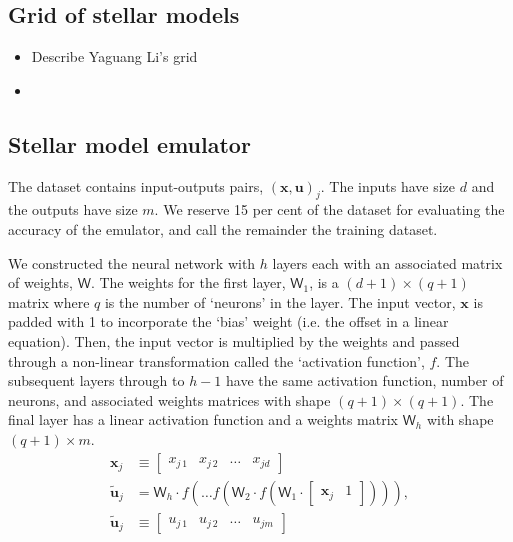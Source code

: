 \documentclass[fleqn,usenatbib]{mnras}
\renewcommand*{\vec}[1]{\boldsymbol{#1}}
\newcommand*{\mat}[1]{\boldsymbol{\mathsf{#1}}}
\newcommand{\inputs}{{\vec{x}}}
\newcommand{\outputs}{{\vec{u}}}
\newcommand{\pred}{{\tilde{\outputs}}}
\begin{document}
\subsection{Grid of stellar models}
\label{sec:grid}

\begin{itemize}
    \item Describe Yaguang Li's grid
    \item 
\end{itemize}

\subsection{Stellar model emulator}
\label{sec:emulator}

The dataset contains input-outputs pairs, \((\inputs, \outputs)_j\). The inputs have size \(d\) and the outputs have size \(m\). We reserve 15 per cent of the dataset for evaluating the accuracy of the emulator, and call the remainder the training dataset.

We constructed the neural network with \(h\) layers each with an associated matrix of weights, \(\mat W\). The weights for the first layer, \(\mat W_1\), is a \((d + 1) \times (q + 1)\) matrix where \(q\) is the number of `neurons' in the layer. The input vector, \(\inputs\) is padded with 1 to incorporate the `bias' weight (i.e. the offset in a linear equation). Then, the input vector is multiplied by the weights and passed through a non-linear transformation called the `activation function', \(f\). The subsequent layers through to \(h-1\) have the same activation function, number of neurons, and associated weights matrices with shape \((q + 1) \times (q + 1)\). The final layer has a linear activation function and a weights matrix \(\mat W_h\) with shape \((q + 1) \times m\). 
%
%
%
\begin{align}
    \vec x_j &\equiv 
    \begin{bmatrix}
        x_{j\,1} & x_{j\,2} & \dots & x_{jd}
    \end{bmatrix}\\
    \pred_j &= \mat W_h \cdot f ( \dots f ( \mat W_2 \cdot f ( \mat W_1 \cdot
    \begin{bmatrix}
        \vec x_j & 1
    \end{bmatrix} 
    ) ) ),\\
    \pred_j &\equiv
    \begin{bmatrix}
        u_{j\,1} & u_{j\,2} & \dots & u_{jm}
    \end{bmatrix}
\end{align}
%
\end{document}
